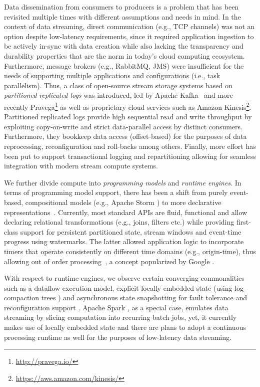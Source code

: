 Data dissemination from consumers to producers is a problem that has been revisited multiple times with different assumptions and needs in mind. In the context of data streaming, direct communication (e.g., TCP channels) was not an option despite low-latency requirements, since it required application ingestion to be actively in-sync with data creation while also lacking the transparency and durability properties that are the norm in today's cloud computing ecosystem. Furthermore, message brokers (e.g., \textsf{RabbitMQ}, \textsf{JMS}) were insufficient for the needs of supporting multiple applications and configurations (i.e., task parallelism). Thus, a class of open-source stream storage systems based on \emph{partitioned replicated logs} was introduced, led by \textsf{Apache Kafka}~\cite{kreps2011kafka} and more recently \textsf{Pravega}\footnote{\url{http://pravega.io/}} as well as proprietary cloud services such as \textsf{Amazon Kinesis}\footnote{\url{https://aws.amazon.com/kinesis/}}. Partitioned replicated logs provide high sequential read and write throughput by exploiting copy-on-write and strict data-parallel access by distinct consumers. Furthermore, they bookkeep data access (offset-based) for the purposes of data reprocessing, reconfiguration and roll-backs among others. Finally, more effort has been put to support transactional logging and repartitioning allowing for seamless integration with modern stream compute systems.

 We further divide compute into \emph{programming models} and \emph{runtime engines}. In terms of programming model support, there has been a shift from purely event-based, compositional models (e.g., \textsf{Apache Storm} \cite{toshniwal_et_al_2014}) to more declarative representations~\cite{carbone_et_al_2015,akidau2015dataflow,zaharia_et_al_2013}. Currently, most standard APIs are fluid, functional and allow declaring relational transformations (e.g., joins, filters etc.) while providing first-class support for persistent partitioned state, stream windows and event-time progress using watermarks. The latter allowed application logic to incorporate timers that operate consistently on different time domains (e.g., origin-time), thus allowing out of order processing~\cite{li2008out},  a concept popularized by Google \cite{millwheel,akidau2015dataflow}.

With respect to runtime engines, we observe certain converging commonalities such as a dataflow execution model, explicit locally embedded state (using log-compaction trees \cite{CUSTOM:web/rocksdb}) and asynchronous state snapshotting for fault tolerance and reconfiguration support \cite{state2017carbone,jacques2016consistent}. Apache Spark \cite{zaharia_et_al_2013}, as a special case, emulates data streaming by slicing computation into recurring batch jobs, yet, it currently makes use of locally embedded state and there are plans to adopt a continuous processing runtime as well for the purposes of low-latency data streaming.


